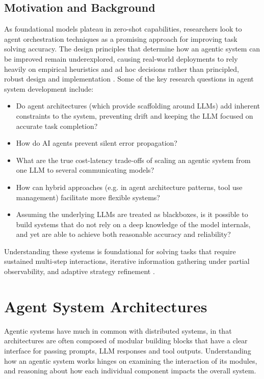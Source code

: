 \documentclass[conference]{IEEEtran}
\begin{document}
\subsection{Motivation and Background}
As foundational models plateau in zero-shot capabilities, researchers look to agent orchestration
techniques as a promising approach for improving task solving accuracy.
The design principles that determine how an agentic system can be improved remain underexplored,
causing real-world deployments to rely heavily on empirical heuristics and ad hoc decisions
rather than principled, robust design and implementation \cite{kim_towards_2026}. 
Some of the key research questions in agent system development include: 
\begin{itemize}
	\item Do agent architectures (which provide scaffolding around LLMs) add inherent constraints to the
		system, preventing drift and keeping the LLM focused on accurate task completion?
	\item How do AI agents prevent silent error propagation? 
	\item What are the true cost-latency trade-offs of scaling an agentic system from one LLM to
		several communicating models? 
	\item How can hybrid approaches (e.g. in agent architecture patterns, tool use management)
		facilitate more flexible systems? 
	\item Assuming the underlying LLMs are treated as blackboxes, is it possible to build systems
		that do not rely on a deep knowledge of the model internals, and yet are able to achieve
		both reasonable accuracy and reliability?
\end{itemize}
Understanding these systems is foundational for solving tasks that require
sustained multi-step interactions, iterative information gathering under partial observability,
and adaptive strategy refinement \cite{kim_towards_2026}.

\section{Agent System Architectures}
Agentic systems have much in common with distributed systems, in that architectures are often composed 
of modular building blocks that have a clear interface for passing prompts, LLM responses and tool outputs. 
Understanding how an agentic system works hinges on examining the interaction of its modules,
and reasoning about how each individual component impacts the overall system.
\end{document}
